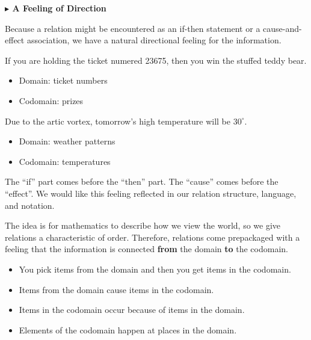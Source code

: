 \documentclass{ximera}
\begin{document}
\textbf{\textcolor{red!70!black}{$\blacktriangleright$ A Feeling of Direction}}



Because a relation might be encountered as an if-then statement or a cause-and-effect association, we have a natural directional feeling for the information.  



\begin{idea}
If you are holding the ticket numered 23675, then you win the stuffed teddy bear. \\

\begin{itemize}
    \item Domain: ticket numbers
    \item Codomain: prizes
\end{itemize}

\end{idea}



\begin{idea}
Due to the artic vortex, tomorrow's high temperature will be $30^{\circ}$. \\

\begin{itemize}
    \item Domain: weather patterns
    \item Codomain: temperatures
\end{itemize}

\end{idea}

The ``if'' part comes before the ``then'' part.  The ``cause'' comes before the ``effect''.  We would like this feeling reflected in our relation structure, language, and notation.  


The idea is for mathematics to describe how we view the world, so we give relations a characteristic of order. Therefore, relations come prepackaged with a feeling that the information is connected \textbf{\textcolor{purple!85!blue}{from}} the domain \textbf{\textcolor{purple!85!blue}{to}} the codomain.






\begin{itemize}
\item You pick items from the domain and then you get items in the codomain.
\item Items from the domain cause items in the codomain.
\item Items in the codomain occur because of items in the domain.
\item Elements of the codomain happen at places in the domain.
\end{itemize}
\end{document}
